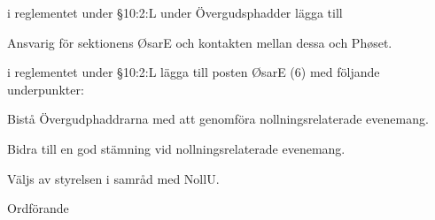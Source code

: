 \documentclass[../_main/handlingar.tex]{subfiles}
\begin{document}
\begin{attsatser}
    \att i reglementet under \S10:2:L under Övergudsphadder lägga till
    \begin{dashlist}
        \item Ansvarig för sektionens ØsarE och kontakten mellan dessa och Phøset. 
    \end{dashlist}

    \att i reglementet under \S10:2:L lägga till posten ØsarE (6) med följande underpunkter:
    \begin{dashlist}
        \item Bistå Övergudphaddrarna med att genomföra nollningsrelaterade evenemang.
        \item Bidra till en god stämning vid nollningsrelaterade evenemang.
        \item Väljs av styrelsen i samråd med NollU.
    \end{dashlist}
\end{attsatser}

\begin{signatures}{1}
    \ist
    \signature{\ordf}{Ordförande}
\end{signatures}
\end{document}
